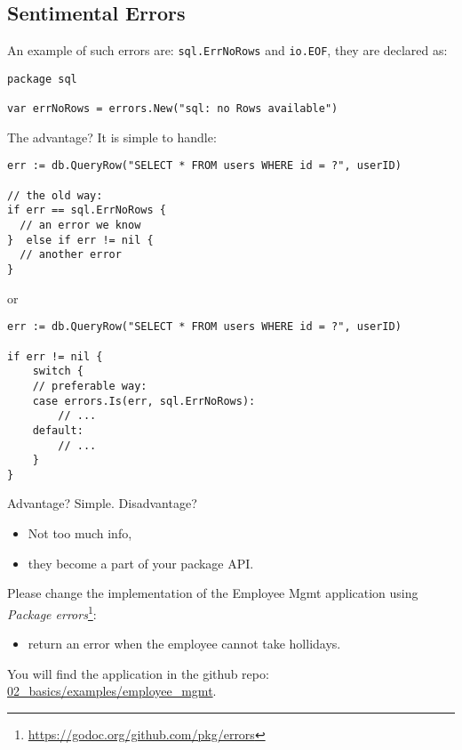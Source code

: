 \documentclass[11pt, letterpaper]{article}
\begin{document}
\subsection{Sentimental Errors}

An example of such errors are: \texttt{sql.ErrNoRows} and \texttt{io.EOF}, they are declared as:

\begin{verbatim}
package sql

var errNoRows = errors.New("sql: no Rows available")
\end{verbatim}

The advantage? It is simple to handle:

\begin{verbatim}
err := db.QueryRow("SELECT * FROM users WHERE id = ?", userID)

// the old way:
if err == sql.ErrNoRows {
  // an error we know
}  else if err != nil { 
  // another error
}
\end{verbatim}

or

\begin{verbatim}
err := db.QueryRow("SELECT * FROM users WHERE id = ?", userID)

if err != nil {
	switch {
	// preferable way:
	case errors.Is(err, sql.ErrNoRows):
		// ...
	default:
		// ...
	}
}
\end{verbatim}

Advantage? Simple. Disadvantage? \begin{itemize}%
\item Not too much info,
\item they become a part of your package {\small API}.
\end{itemize}%

\bigskip

Please change the implementation of the Employee Mgmt application using \emph{Package errors}\footnote{\href{https://godoc.org/github.com/pkg/errors}{https://godoc.org/github.com/pkg/errors}}: \begin{itemize}%
\item return an error when the employee cannot take hollidays.
\end{itemize}%


You will find the application in the github repo:\\
\href{https://github.com/wojciech11/workshop\_golang/tree/master/02\_basics/examples/employee\_mgmt}{02\_basics/examples/employee\_mgmt}.
\end{document}
